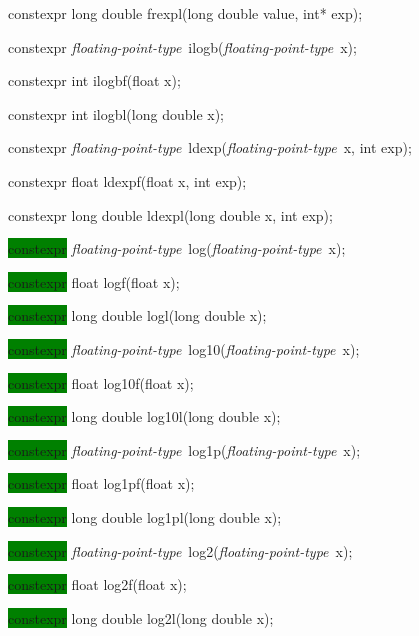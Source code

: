 \documentclass[prd,twocolumn,amsmath,amssymb,nofootinbib,eqsecnum]{revtex4-1}
\newcommand{\highlight}[1]{\colorbox{green}{\!\!\!\! #1}}
\newcommand{\oldhighlight}[1]{#1}
\newcommand{\fptype}{{\it floating-point-type}}
\begin{document}
{\oldhighlight{constexpr}  long double frexpl(long double value, int* exp);

\vspace{2ex}


\oldhighlight{constexpr} \fptype\ ilogb(\fptype\ x);

\oldhighlight{constexpr} int ilogbf(float x);

\oldhighlight{constexpr} int ilogbl(long double x);

\vspace{2ex}


\oldhighlight{constexpr} \fptype\ ldexp(\fptype\ x, int exp);

\oldhighlight{constexpr} float ldexpf(float x, int exp);

\oldhighlight{constexpr} long double ldexpl(long double x, int exp);

\vspace{2ex}


\highlight{constexpr} \fptype\  log(\fptype\ x);

\highlight{constexpr} float logf(float x);

\highlight{constexpr} long double logl(long double x);

\vspace{2ex}


\highlight{constexpr} \fptype\  log10(\fptype\ x);

\highlight{constexpr} float log10f(float x);

\highlight{constexpr} long double log10l(long double x);

\vspace{2ex}


\highlight{constexpr} \fptype\ log1p(\fptype\ x);

\highlight{constexpr} float log1pf(float x);

\highlight{constexpr} long double log1pl(long double x);

\vspace{2ex}


\highlight{constexpr} \fptype\ log2(\fptype\ x);

\highlight{constexpr} float log2f(float x);

\highlight{constexpr} long double log2l(long double x);

}
\end{document}
